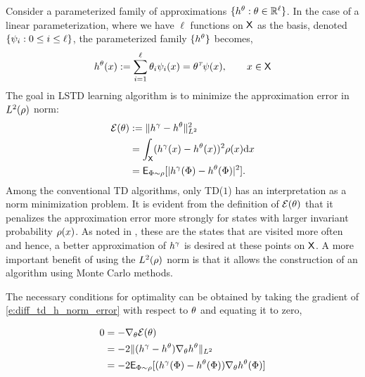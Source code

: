Consider a parameterized family of approximations $\{h^\theta : \theta \in \mathbb{R}^\ell\}$. In the case of a linear parameterization, where we have $\ell$ functions on ${\sf X}$ as the basis, denoted $\{\psi_i : 0 \leq i \leq \ell\}$, the parameterized family $\{h^\theta\}$ becomes, %
\begin{equation}
h^\param(x) := \sum_{i=1}^\ell \param_i \basis_i(x) = \param^\transpose \basis(x), \qquad x \in \state
\label{e:diff_td_linear_param}
\end{equation}
The goal in LSTD learning algorithm is to minimize the approximation error in $L^2(\rho)$ norm:
\begin{equation}
\begin{aligned}
\error(\param) &:=  \| h^\discount - h^\param \|^2_{L^2} \\
& = \int_\state (h^\discount(x) - h^\param(x))^2 \pr(x) \ud x \\
& = \Expect_{\markovstate \sim \pr} [|h^\discount(\markovstate) - h^\param(\markovstate)|^2].
\label{e:diff_td_h_norm_error}
\end{aligned}
\end{equation}
Among the conventional TD algorithms, only TD($1$) has an interpretation as a norm minimization problem. It is evident from the definition of $\mathcal{E}(\theta)$ that it penalizes the approximation error more strongly for states with larger invariant probability $\rho(x)$. As noted in \cite{ctcn}, these are the states that are visited more often and hence, a better approximation of $h^\gamma$ is desired at these points on ${\sf X}$. A more important benefit of using the $L^2(\rho)$ norm is that it allows the construction of an algorithm using Monte Carlo methods. 

The necessary conditions for optimality can be obtained by taking the gradient of \eqref{e:diff_td_h_norm_error} with respect to $\theta$ and equating it to zero, 

\begin{equation}
\begin{aligned}
0 &= - \nabla_\param \error(\param)\\
& = - 2 \|(h^\discount - h^\param) \nabla_\param h^\param \|_{L^2} \\
& = - 2 \Expect_{\markovstate \sim \pr} [(h^\discount(\markovstate) - h^\param(\markovstate)) \nabla_\param h^\param(\markovstate)]
\end{aligned}
\label{e:diff_td_first_order_condition}
\end{equation} 

